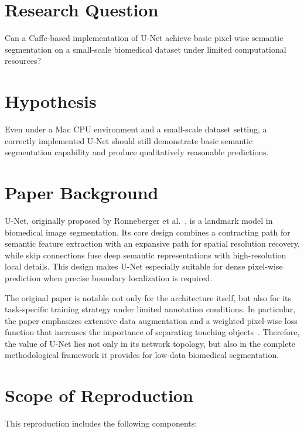 \documentclass[11pt]{article}
\begin{document}
\section{Research Question}

Can a Caffe-based implementation of U-Net achieve basic pixel-wise semantic segmentation on a small-scale biomedical dataset under limited computational resources?

\section{Hypothesis}

Even under a Mac CPU environment and a small-scale dataset setting, a correctly implemented U-Net should still demonstrate basic semantic segmentation capability and produce qualitatively reasonable predictions.

\section{Paper Background}

U-Net, originally proposed by Ronneberger et al.~\cite{ronneberger2015u}, is a landmark model in biomedical image segmentation. Its core design combines a contracting path for semantic feature extraction with an expansive path for spatial resolution recovery, while skip connections fuse deep semantic representations with high-resolution local details. This design makes U-Net especially suitable for dense pixel-wise prediction when precise boundary localization is required.

The original paper is notable not only for the architecture itself, but also for its task-specific training strategy under limited annotation conditions. In particular, the paper emphasizes extensive data augmentation and a weighted pixel-wise loss function that increases the importance of separating touching objects~\cite{ronneberger2015u}. Therefore, the value of U-Net lies not only in its network topology, but also in the complete methodological framework it provides for low-data biomedical segmentation.

\section{Scope of Reproduction}

This reproduction includes the following components:
\end{document}
